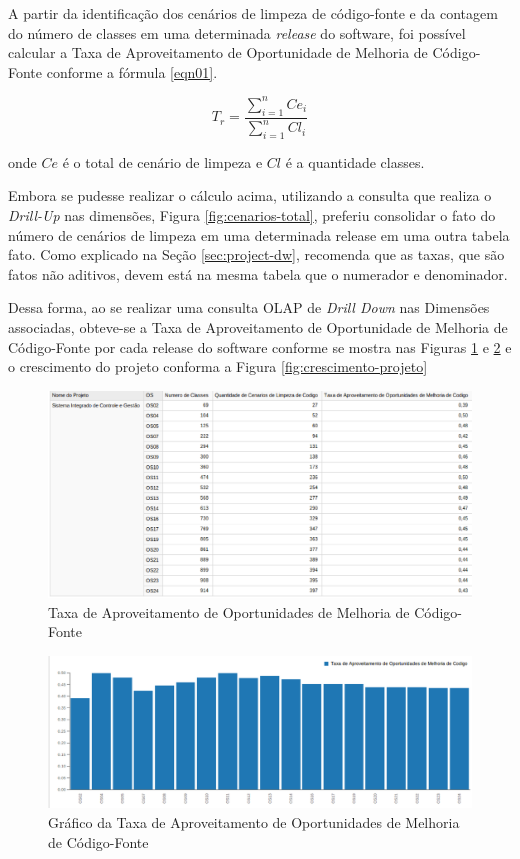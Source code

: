 A partir da identificação dos cenários de limpeza de código-fonte e da contagem do número de classes em uma determinada \textit{release} do software, foi possível calcular a Taxa de Aproveitamento de Oportunidade de Melhoria de Código-Fonte conforme a fórmula \ref{eqn01}.

\begin{equation}
\label{eqn01}
T_r =   \frac{{\sum_{i=1}^{n}{Ce_i}}}{\sum_{i=1}^{n}{Cl_i}}
\end{equation}

onde $ Ce $ é o total de cenário de limpeza e $ Cl $ é a quantidade classes.

 Embora se pudesse realizar o cálculo acima, utilizando a consulta que realiza o \textit{Drill-Up} nas dimensões, Figura \ref{fig:cenarios-total}, preferiu consolidar o fato do número de cenários de limpeza em uma determinada release em uma outra tabela fato. Como explicado na Seção \ref{sec:project-dw},  recomenda 
 que as taxas, que são fatos não aditivos,  devem está na mesma tabela que o numerador e denominador.

 Dessa forma, ao se realizar uma consulta OLAP de \textit{Drill Down} nas Dimensões associadas, obteve-se a Taxa de Aproveitamento de Oportunidade de Melhoria de Código-Fonte por cada release do software conforme se mostra nas Figuras \ref{fig:taxa-cenarios} e \ref{fig:grafico-taxa} e o crescimento do projeto conforma a Figura \ref{fig:crescimento-projeto} 


\begin{figure}[H]
\centering
\includegraphics[keepaspectratio=true,scale=0.48]{figuras/taxa-parcial.eps}
\caption{Taxa de Aproveitamento de Oportunidades de Melhoria de Código-Fonte}
\label{fig:taxa-cenarios}
\end{figure}
\FloatBarrier


\begin{figure}[H]
\centering
\includegraphics[keepaspectratio=false,scale=0.48]{figuras/taxa-grafico.eps}
\caption{Gráfico da Taxa de Aproveitamento de Oportunidades de Melhoria de Código-Fonte}
\label{fig:grafico-taxa}
\end{figure}
\FloatBarrier


